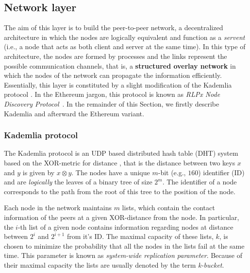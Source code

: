 \subsection{Network layer}
\label{sec:network-layer}

The aim of this layer is to build the peer-to-peer network, a decentralized
architecture in which the nodes are logically equivalent and function as a
\emph{servent} (i.e., a node that acts as both client and server at the same
time). In this type of architecture, the nodes are formed by processes and the
links represent the possible communication channels, that is, a
\textbf{structured overlay network} \cite{van2017distributed} in which the nodes
of the network can propagate the information efficiently. Essentially, this
layer is constituted by a slight modification of the Kademlia protocol
\cite{bib:kademlia}. In the Ethereum jargon, this protocol is known as
\emph{RLPx Node Discovery Protocol}~\cite{bib:rlpx-discovery-protocol}.
In the remainder of this Section, we firstly describe Kademlia and afterward
the Ethereum variant.


\subsubsection{Kademlia protocol}
The Kademlia protocol is an UDP based distributed hash table (DHT)
system based on the
XOR-metric for distance \cite{bib:kademlia}, that is the distance between two
keys $x$ and $y$ is given by $x \otimes y$.
The nodes have a unique $m$-bit (e.g., $160$) identifier (ID) and are
\emph{logically} the leaves of a binary tree of size $2^m$.
The identifier of a node corresponds
to the path from the root of this tree to the position of the node.

Each node in the network maintains $m$ lists, which contain the contact
information of the peers at a given XOR-distance from the node.
In particular, the $i$-th list of a given node contains information regarding
nodes at distance between $2^i$ and $2^{i+1}$ from it's ID.
The maximal capacity of these lists, $k$, is chosen to minimize the probability
that all the nodes in the lists fail at the same time.
This parameter is  known as \emph{system-wide replication parameter}.
Because of their maximal capacity the lists are usually denoted by the term
\emph{k-bucket}.



